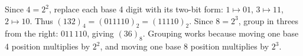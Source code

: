 Since $4=2^2$, replace each base 4 digit with its two-bit form: $1\mapsto 01$, $3\mapsto 11$, $2\mapsto 10$. Thus $(132)_4=(011110)_2=(11110)_2$. Since $8=2^3$, group in threes from the right: $011\,110$, giving $\boxed{(36)_8}$. Grouping works because moving one base 4 position multiplies by $2^2$, and moving one base 8 position multiplies by $2^3$.
